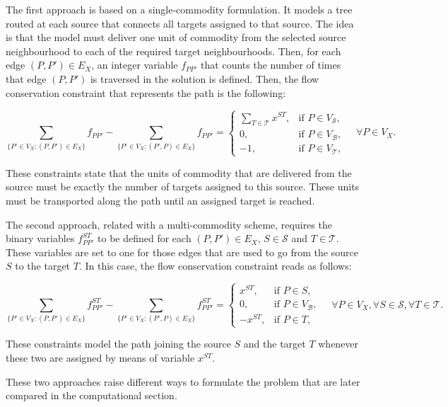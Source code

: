 \documentclass[a4paper,  review, authoryear, 1p.]{elsarticle}
\newcommand{\VB}{{V^{}_{\mathcal B}}}
\newcommand{\VS}{{V^{}_{\mathcal S}}}
\newcommand{\VT}{{V^{}_{\mathcal T}}}
\newcommand{\JP}[1]{{\color{armygreen}#1}}
\begin{document}
{	The first approach is based on a single-commodity formulation. It models a tree routed at each source that connects all targets assigned to that source. The idea is that the model must deliver one unit of commodity from the selected source neighbourhood to each of the required target neighbourhoods. Then, for each edge $(P, P')\in E_X$, an integer variable $f_{PP'}$ that counts the number of times that edge $(P, P')$ is traversed in the solution is defined. Then, the flow conservation constraint that represents the path is the following:
	
	{\small
	\begin{equation}\label{eq:single-flowC}\tag{single-flow-C}
		\sum_{\{P'\in V_X:(P,P')\in E_X\}}f_{PP'}-\sum_{\{P'\in V_X:(P',P)\in E_X\}}f_{PP'} =\left\{
		\begin{array}{rl} 
			\sum_{T\in\mathcal T} x^{ST}, & \text{if } P\in \VS, \\
			0, & \text{if } P\in \VB, \\
			-1, & \text{if }P\in \VT,
		\end{array}
		\right.\quad\forall P\in V_X.
	\end{equation}}

	These constraints state that the units of commodity that are delivered from the source must be exactly the number of targets assigned to this source. These units must be transported along the path until an assigned target is reached.
	
	The second approach, related with a multi-commodity scheme, \JP{requires the binary variables $f_{PP'}^{ST}$  to be defined for each $(P, P')\in E_X$, $S\in\mathcal S$ and $T\in\mathcal T$. }These variables are set to one for those edges that are used to go from the source $S$ to the target $T$. In this case, the flow conservation constraint reads as follows:
	
	{\small
	\begin{equation}\label{eq:multi-flowC}\tag{multi-flow-C}
		\sum_{\{P'\in V_X:(P,P')\in E_X\}}f_{PP'}^{ST}-\sum_{\{P'\in V_X:(P',P)\in E_X\}}f_{PP'}^{ST} =\left\{
		\begin{array}{rl} 
			x^{ST}, & \text{if } P\in S, \\
			0, & \text{if } P\in \VB, \\
			-x^{ST}, & \text{if }P\in T,
		\end{array}
		\right.\quad\forall P\in V_X,\forall S\in\mathcal S,\forall T\in\mathcal T.
	\end{equation}}

	These constraints model the path joining the source $S$ and the target $T$ whenever these two  are assigned by means of variable $x^{ST}$.
	
	These two approaches raise different ways to formulate the problem that are later compared in the computational section.
	
	
	\newcommand{\xvar}[2]{x(#1#2)}
	
}
	
\end{document}
